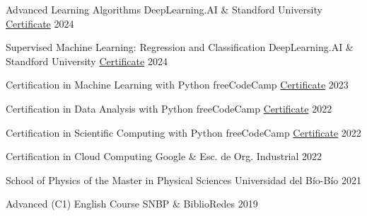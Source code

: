 

\begin{cvhonors}

  \cvhonor
    {Advanced Learning Algorithms} %
    {DeepLearning.AI \& Standford University} %
    {\href{https://www.coursera.org/account/accomplishments/verify/7LYMUB6N88QZ}{Certificate}} %
    {2024} %


  \cvhonor
    {Supervised Machine Learning: Regression and Classification} %
    {DeepLearning.AI \& Standford University} %
    {\href{https://www.coursera.org/account/accomplishments/verify/J4UMQZEMDBB8}{Certificate}} %
    {2024} %

  \cvhonor
    {Certification in Machine Learning with Python} %
    {freeCodeCamp} %
    {\href{https://www.freecodecamp.org/certification/_joacoh/machine-learning-with-python-v7}{Certificate}} %
    {2023} %

  \cvhonor
    {Certification in Data Analysis with Python} %
    {freeCodeCamp} %
    {\href{https://freecodecamp.org/certification/_joacoh/data-analysis-with-python-v7}{Certificate}} %
    {2022} %

  \cvhonor
    {Certification in Scientific Computing with Python} %
    {freeCodeCamp} %
    {\href{https://freecodecamp.org/certification/_joacoh/scientific-computing-with-python-v7}{Certificate}} %
    {2022} %

  \cvhonor
    {Certification in Cloud Computing} %
    {Google \& Esc. de Org. Industrial} %
    {} %
    {2022} %

  \cvhonor
    {School of Physics of the Master in Physical Sciences} %
    {Universidad del Bío-Bío} %
    {} %
    {2021} %

  \cvhonor
    {Advanced (C1) English Course} %
    {SNBP \& BiblioRedes} %
    {} %
    {2019} %

\end{cvhonors}
